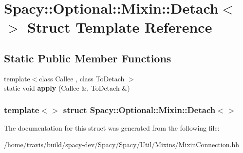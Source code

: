 \hypertarget{structSpacy_1_1Optional_1_1Mixin_1_1Detach_3_4}{\section{\-Spacy\-:\-:\-Optional\-:\-:\-Mixin\-:\-:\-Detach$<$$>$ \-Struct \-Template \-Reference}
\label{structSpacy_1_1Optional_1_1Mixin_1_1Detach_3_4}
}
\subsection*{\-Static \-Public \-Member \-Functions}
\begin{DoxyCompactItemize}
\item 
\hypertarget{structSpacy_1_1Optional_1_1Mixin_1_1Detach_3_4_a1ab6239f02532537e4b908bcc5cd77d1}{{\footnotesize template$<$class Callee , class To\-Detach $>$ }\\static void {\bfseries apply} (\-Callee \&, \-To\-Detach \&)}\label{structSpacy_1_1Optional_1_1Mixin_1_1Detach_3_4_a1ab6239f02532537e4b908bcc5cd77d1}

\end{DoxyCompactItemize}
\subsubsection*{template$<$$>$ struct Spacy\-::\-Optional\-::\-Mixin\-::\-Detach$<$$>$}



\-The documentation for this struct was generated from the following file\-:\begin{DoxyCompactItemize}
\item 
/home/travis/build/spacy-\/dev/\-Spacy/\-Spacy/\-Util/\-Mixins/\-Mixin\-Connection.\-hh\end{DoxyCompactItemize}
